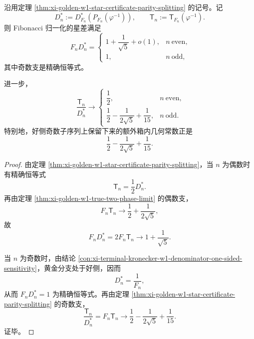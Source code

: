 \begin{corollary}\label{cor:xi-golden-fibonacci-star-w1-normalized-parity}
沿用定理 \ref{thm:xi-golden-w1-star-certificate-parity-splitting} 的记号。记
\[
D_n^\ast:=D_{F_n}^\ast(P_{F_n}(\varphi^{-1})),
\qquad
\mathsf{T}_n:=\mathsf{T}_{F_n}(\varphi^{-1}).
\]
则 Fibonacci 归一化的星差满足
\[
\boxed{\;
F_nD_n^\ast=
\begin{cases}
1+\dfrac{1}{\sqrt5}+o(1),& n\ \mathrm{even},\\[2mm]
1,& n\ \mathrm{odd},
\end{cases}}
\]
其中奇数支是精确恒等式。

进一步，
\[
\boxed{\;
\frac{\mathsf{T}_n}{D_n^\ast}\to
\begin{cases}
\dfrac12,& n\ \mathrm{even},\\[2mm]
\dfrac12-\dfrac{1}{2\sqrt5}+\dfrac1{15},& n\ \mathrm{odd}.
\end{cases}}
\]
特别地，好侧奇数子序列上保留下来的额外箱内几何常数正是
\[
\frac12-\frac{1}{2\sqrt5}+\frac1{15}.
\]
\end{corollary}
\begin{proof}
由定理 \ref{thm:xi-golden-w1-star-certificate-parity-splitting}，当 \(n\) 为偶数时有精确恒等式
\[
\mathsf{T}_n=\frac12 D_n^\ast.
\]
再由定理 \ref{thm:xi-golden-w1-true-two-phase-limit} 的偶数支，
\[
F_n\mathsf{T}_n\to \frac12+\frac{1}{2\sqrt5},
\]
故
\[
F_nD_n^\ast=2F_n\mathsf{T}_n\to 1+\frac1{\sqrt5}.
\]

当 \(n\) 为奇数时，由结论 \ref{con:xi-terminal-kronecker-w1-denominator-one-sided-sensitivity}，黄金分支处于好侧，因而
\[
D_n^\ast=\frac1{F_n},
\]
从而 \(F_nD_n^\ast=1\) 为精确恒等式。再由定理
\ref{thm:xi-golden-w1-star-certificate-parity-splitting} 的奇数支，
\[
\frac{\mathsf{T}_n}{D_n^\ast}
=
F_n\mathsf{T}_n
\to
\frac12-\frac{1}{2\sqrt5}+\frac1{15}.
\]
证毕。
\end{proof}

